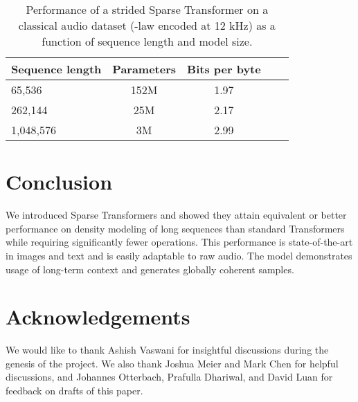 \documentclass{article}
\begin{document}
\begin{table}[h]
\caption{Performance of a strided Sparse Transformer on a classical audio dataset (-law encoded at 12 kHz) as a function of sequence length and model size.}
\label{audio}
\vskip 0.15in
\begin{center}
\begin{small}
\begin{tabular}{lcccr}
\toprule
Sequence length & Parameters & Bits per byte \\
\midrule
65,536 & 152M & 1.97 \\
262,144 & 25M & 2.17 \\
1,048,576 & 3M & 2.99 \\

\bottomrule
\end{tabular}
\end{small}
\end{center}
\vskip -0.1in
\end{table}

\section{Conclusion}
We introduced Sparse Transformers and showed they attain equivalent or better performance on density modeling of long sequences than standard Transformers while requiring significantly fewer operations. This performance is state-of-the-art in images and text and is easily adaptable to raw audio. The model demonstrates usage of long-term context and generates globally coherent samples.

\section{Acknowledgements}
We would like to thank Ashish Vaswani for insightful discussions during the genesis of the project. We also thank Joshua Meier and Mark Chen for helpful discussions, and Johannes Otterbach, Prafulla Dhariwal, and David Luan for feedback on drafts of this paper.

\nocite{chen2017pixelsnail}
\nocite{salimans2017pixelcnn++}



\end{document}
